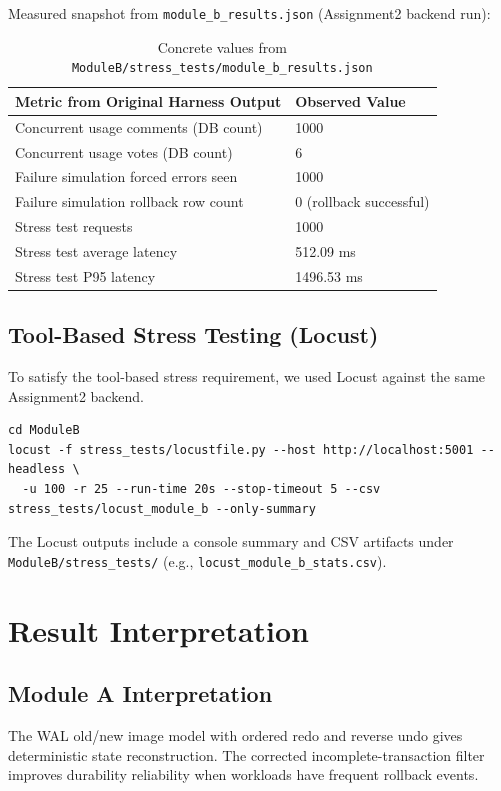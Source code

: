 \documentclass[12pt,a4paper]{article}
\begin{document}
Measured snapshot from \texttt{module\_b\_results.json} (Assignment2 backend run):
\begin{table}[H]
\centering
\begin{tabularx}{\textwidth}{lX}
\hline
\textbf{Metric from Original Harness Output} & \textbf{Observed Value} \\
\hline
Concurrent usage comments (DB count) & 1000 \\
Concurrent usage votes (DB count) & 6 \\
Failure simulation forced errors seen & 1000 \\
Failure simulation rollback row count & 0 (rollback successful) \\
Stress test requests & 1000 \\
Stress test average latency & 512.09 ms \\
Stress test P95 latency & 1496.53 ms \\
\hline
\end{tabularx}
\caption{Concrete values from \texttt{ModuleB/stress\_tests/module\_b\_results.json}}
\end{table}

\subsection{Tool-Based Stress Testing (Locust)}
To satisfy the tool-based stress requirement, we used Locust against the same Assignment2 backend.

\begin{lstlisting}[basicstyle=\ttfamily\small, caption={Locust command used for Module B stress testing}]
cd ModuleB
locust -f stress_tests/locustfile.py --host http://localhost:5001 --headless \
  -u 100 -r 25 --run-time 20s --stop-timeout 5 --csv stress_tests/locust_module_b --only-summary
\end{lstlisting}

The Locust outputs include a console summary and CSV artifacts under \texttt{ModuleB/stress\_tests/} (e.g., \texttt{locust\_module\_b\_stats.csv}).

\section{Result Interpretation}

\subsection{Module A Interpretation}
The WAL old/new image model with ordered redo and reverse undo gives deterministic state reconstruction. The corrected incomplete-transaction filter improves durability reliability when workloads have frequent rollback events.
\end{document}
